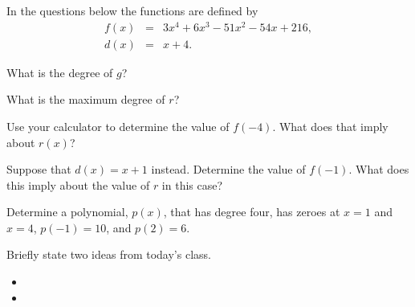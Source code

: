 \begin{problem}
  In the questions below the functions are defined by
  \begin{eqnarray*}
    f(x) & = & 3x^4+6x^3-51x^2-54x+216, \\
    d(x) & = & x+4.
  \end{eqnarray*}
  \begin{subproblem}
  \item What is the degree of $g$?

    \vfill

  \item What is the maximum degree of $r$?

    \vfill

  \item Use your calculator to determine the value of $f(-4)$. What
    does that imply about $r(x)$?

    \vfill

  \item Suppose that $d(x)=x+1$ instead. Determine the value of
    $f(-1)$. What does this imply about the value of $r$ in this case?

    \vfill
    
  \end{subproblem}

  \clearpage

\item Determine a polynomial, $p(x)$, that has degree four, has zeroes at $x=1$
  and $x=4$, $p(-1)=10$, and $p(2)=6$.

  \vfill

\end{problem}

\postClass

\begin{problem}
\item Briefly state two ideas from today's class.
  \begin{itemize}
  \item 
  \item 
  \end{itemize}
\item 
  \begin{subproblem}
    \item
  \end{subproblem}
\end{problem}




